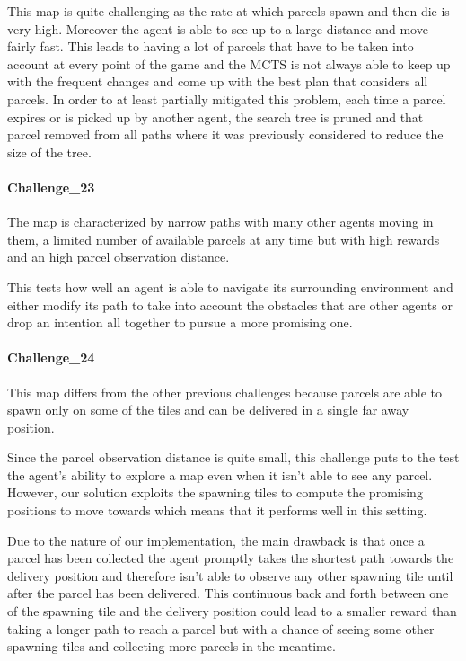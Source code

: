 This map is quite challenging as the rate at which parcels spawn and then die is very high. Moreover the agent is able to see up to a large distance and move fairly fast. This leads to having a lot of parcels that have to be taken into account at every point of the game and the MCTS is not always able to keep up with the frequent changes and come up with the best plan that considers all parcels. In order to at least partially mitigated this problem, each time a parcel expires or is picked up by another agent, the search tree is pruned and that parcel removed from all paths where it was previously considered to reduce the size of the tree.


\paragraph{Challenge\_23} The map is characterized by narrow paths with many other agents moving in them, a limited number of available parcels at any time but with high rewards and an high parcel observation distance.

This tests how well an agent is able to navigate its surrounding environment and either modify its path to take into account the obstacles that are other agents or drop an intention all together to pursue a more promising one.


\paragraph{Challenge\_24} This map differs from the other previous challenges because parcels are able to spawn only on some of the tiles and can be delivered in a single far away position.

Since the parcel observation distance is quite small, this challenge puts to the test the agent's ability to explore a map even when it isn't able to see any parcel. However, our solution exploits the spawning tiles to compute the promising positions to move towards which means that it performs well in this setting.

Due to the nature of our implementation, the main drawback is that once a parcel has been collected the agent promptly takes the shortest path towards the delivery position and therefore isn't able to observe any other spawning tile until after the parcel has been delivered. This continuous back and forth between one of the spawning tile and the delivery position could lead to a smaller reward than taking a longer path to reach a parcel but with a chance of seeing some other spawning tiles and collecting more parcels in the meantime.


